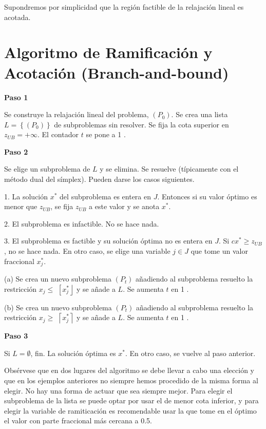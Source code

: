 \documentclass[openany]{book}
\begin{document}
Supondremos por simplicidad que la región factible de la relajación lineal es acotada.

\section{Algoritmo de Ramificación y Acotación (Branch-and-bound)}

\begin{center}
\textbf{Paso 1}
\end{center}

Se construye la relajación lineal del problema, $\left(P_{0}\right) .$ Se crea una lista $L=\left\{\left(P_{0}\right)\right\}$ de subproblemas sin resolver. Se fija la cota superior en $z_{U B}=+\infty .$ El contador $t$ se pone a 1 .

\begin{center}
\textbf{Paso 2}
\end{center}

Se elige un subproblema de $L$ y se elimina. Se resuelve (típicamente con el método dual del símplex). Pueden darse los casos siguientes.

1. La solución $x^{*}$ del subproblema es entera en $J$. Entonces si su valor óptimo es menor que $z_{U B}$, se fija $z_{U B}$ a este valor y se anota $x^{*}$.

2. El subproblema es infactible. No se hace nada.

3. El subproblema es factible y su solución óptima no es entera en $J$. Si $c x^{*} \geq z_{U B}$, no se hace nada. En otro caso, se elige una variable $j \in J$ que tome un valor fraccional $x_{j}^{*}$.

(a) Se crea un nuevo subproblema $\left(P_{t}\right)$ añadiendo al subproblema resuelto la restricción $x_{j} \leq$ $\left[x_{j}^{*}\right\rfloor$ y se añade a $L .$ Se aumenta $t$ en 1 .

(b) Se crea un nuevo subproblema $\left(P_{t}\right)$ añadiendo al subproblema resuelto la restricción $x_{j} \geq$ $\left\lceil x_{j}^{*}\right\rceil$ y se añade a $L .$ Se aumenta $t$ en 1 .

\begin{center}
\textbf{Paso 3}
\end{center}

Si $L=\emptyset$, fin. La solución óptima es $x^{*}$. En otro caso, se vuelve al paso anterior.

Obsérvese que en dos lugares del algoritmo se debe llevar a cabo una elección y que en los ejemplos anteriores no siempre hemos procedido de la misma forma al elegir. No hay una forma de actuar que sea siempre mejor. Para elegir el subproblema de la lista se puede optar por usar el de menor cota inferior, y para elegir la variable de ramiticación es recomendable usar la que tome en el óptimo el valor con parte fraccional más cercana a 0.5.
\end{document}
